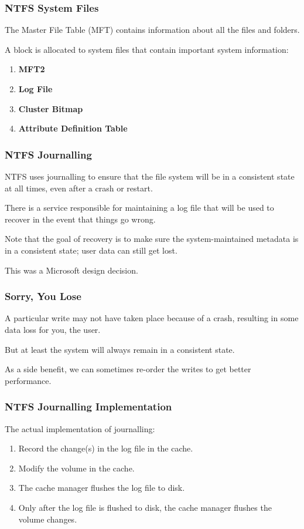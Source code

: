 \begin{frame}
	\frametitle{NTFS System Files}

	The Master File Table (MFT) contains information about all the files and folders.

	A block is allocated to system files that contain important system information:

	\begin{enumerate}
		\item \textbf{MFT2}
		\item \textbf{Log File}
		\item \textbf{Cluster Bitmap}
		\item \textbf{Attribute Definition Table}
	\end{enumerate}
\end{frame}


\begin{frame}
	\frametitle{NTFS Journalling}

	NTFS uses journalling to ensure that the file system will be in a consistent state at all times, even after a crash or restart.

	There is a service responsible for maintaining a log file that will be used to recover in the event that things go wrong.

	Note that the goal of recovery is to make sure the system-maintained metadata is in a consistent state; user data can still get lost.

	This was a Microsoft design decision.

\end{frame}


\begin{frame}
	\frametitle{Sorry, You Lose}

	A particular write may not have taken place because of a crash, resulting in some data loss for you, the user.

	But at least the system will always remain in a consistent state.

	As a side benefit, we can sometimes re-order the writes to get better performance.


\end{frame}


\begin{frame}
	\frametitle{NTFS Journalling Implementation}

	The actual implementation of journalling:

	\begin{enumerate}
		\item Record the change(s) in the log file in the cache.
		\item Modify the volume in the cache.
		\item The cache manager flushes the log file to disk.
		\item Only after the log file is flushed to disk, the cache manager flushes the volume changes.
	\end{enumerate}

\end{frame}


